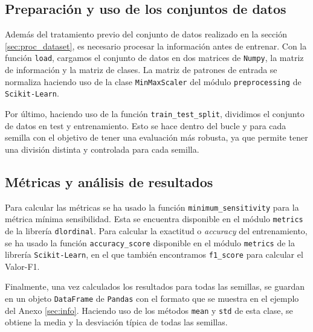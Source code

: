 \subsection{Preparación y uso de los conjuntos de datos}
\label{subsec:datos_experimentales}

Además del tratamiento previo del conjunto de datos realizado en la sección \ref{sec:proc_dataset}, es necesario procesar la información antes de entrenar. Con la función \texttt{load}, cargamos el conjunto de datos en dos matrices de \texttt{Numpy}, la matriz de información y la matriz de clases. La matriz de patrones de entrada se normaliza haciendo uso de la clase \texttt{MinMaxScaler} del módulo \texttt{preprocessing} de \texttt{Scikit-Learn}.

\vspace{1em}

Por último, haciendo uso de la función \texttt{train\_test\_split}, dividimos el conjunto de datos en test y entrenamiento. Esto se hace dentro del bucle y para cada semilla con el objetivo de tener una evaluación más robusta, ya que permite tener una división distinta y controlada para cada semilla.

\subsection{Métricas y análisis de resultados}
\label{subsec:metricas_pruebas}

Para calcular las métricas se ha usado la función \texttt{minimum\_sensitivity} para la métrica mínima sensibilidad. Esta se encuentra disponible en el módulo \texttt{metrics} de la librería \texttt{dlordinal}. Para calcular la exactitud o \textit{accuracy} del entrenamiento, se ha usado la función \texttt{accuracy\_score} disponible en el módulo \texttt{metrics} de la librería \texttt{Scikit-Learn}, en el que también encontramos \texttt{f1\_score} para calcular el Valor-F1.

\vspace{1em}

Finalmente, una vez calculados los resultados para todas las semillas, se guardan en un objeto \texttt{DataFrame} de \texttt{Pandas} con el formato que se muestra en el ejemplo del Anexo \ref{sec:info}. Haciendo uso de los métodos \texttt{mean} y \texttt{std} de esta clase, se obtiene la media y la desviación típica de todas las semillas.

